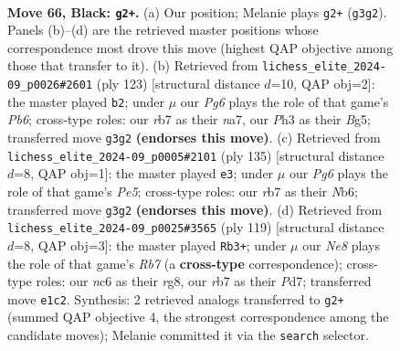\documentclass[11pt]{article}
\begin{document}
\clearpage

\begin{figure}[p]\centering
\begin{subfigure}{0.46\textwidth}\centering
\resizebox{\linewidth}{!}{%
\newchessgame
\chessboard[
  setfen={8/1R6/2Np4/8/5k2/6pp/8/4n2K b - - 1 66},
  showmover=false,
  pgfstyle=straightmove, color=movearrow, markmove={g3-g2}
]}
\caption{}
\end{subfigure}\hfill
\begin{subfigure}{0.46\textwidth}\centering
\resizebox{\linewidth}{!}{%
\newchessgame
\chessboard[
  setfen={8/N7/8/3p2b1/4p3/1pk5/8/3K4 b - - 3 62},
  showmover=false,
  pgfstyle=straightmove, color=movearrow, markmove={b3-b2}
]}
\caption{}
\end{subfigure}
\\[4pt]
\begin{subfigure}{0.46\textwidth}\centering
\resizebox{\linewidth}{!}{%
\newchessgame
\chessboard[
  setfen={8/8/1n6/8/4pk2/p6p/4K3/5N2 b - - 3 68},
  showmover=false,
  pgfstyle=straightmove, color=movearrow, markmove={e4-e3}
]}
\caption{}
\end{subfigure}\hfill
\begin{subfigure}{0.46\textwidth}\centering
\resizebox{\linewidth}{!}{%
\newchessgame
\chessboard[
  setfen={6R1/3p4/8/3ppk2/8/4K3/1r6/8 b - - 0 60},
  showmover=false,
  pgfstyle=straightmove, color=movearrow, markmove={b2-b3}
]}
\caption{}
\end{subfigure}
\caption{\textbf{Move 66, Black: \texttt{g2+}.} (a) Our position; Melanie plays \texttt{g2+} (\texttt{g3g2}). Panels (b)--(d) are the retrieved master positions whose correspondence most drove this move (highest QAP objective among those that transfer to it). (b) Retrieved from \texttt{lichess\_elite\_2024-09\_p0026\#2601} (ply 123) [structural distance $d$=10, QAP obj=2]: the master played \texttt{b2}; under $\mu$ our \emph{Pg6} plays the role of that game's \emph{Pb6}; cross-type roles: our \emph{r}b7 as their \emph{n}a7, our \emph{P}h3 as their \emph{B}g5; transferred move \texttt{g3g2} \textbf{(endorses this move)}. (c) Retrieved from \texttt{lichess\_elite\_2024-09\_p0005\#2101} (ply 135) [structural distance $d$=8, QAP obj=1]: the master played \texttt{e3}; under $\mu$ our \emph{Pg6} plays the role of that game's \emph{Pe5}; cross-type roles: our \emph{r}b7 as their \emph{N}b6; transferred move \texttt{g3g2} \textbf{(endorses this move)}. (d) Retrieved from \texttt{lichess\_elite\_2024-09\_p0025\#3565} (ply 119) [structural distance $d$=8, QAP obj=3]: the master played \texttt{Rb3+}; under $\mu$ our \emph{Ne8} plays the role of that game's \emph{Rb7} (a \textbf{cross-type} correspondence); cross-type roles: our \emph{n}c6 as their \emph{r}g8, our \emph{r}b7 as their \emph{P}d7; transferred move \texttt{e1c2}. Synthesis: 2 retrieved analogs transferred to \texttt{g2+} (summed QAP objective 4, the strongest correspondence among the candidate moves); Melanie committed it via the \texttt{search} selector.}
\label{fig:thought-m131}
\end{figure}
\end{document}
